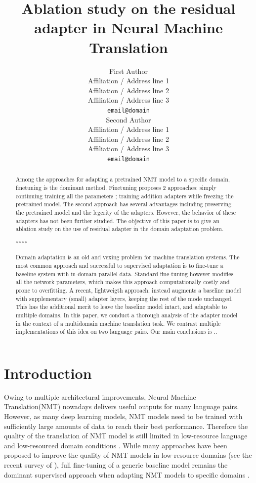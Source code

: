 \documentclass[11pt,a4paper]{article}
\title{Ablation study on the residual adapter in Neural Machine Translation}
\author{First Author \\
  Affiliation / Address line 1 \\
  Affiliation / Address line 2 \\
  Affiliation / Address line 3 \\
  \texttt{email@domain} \\\And
  Second Author \\
  Affiliation / Address line 1 \\
  Affiliation / Address line 2 \\
  Affiliation / Address line 3 \\
  \texttt{email@domain} \\}
\date{}
\newcommand{\fyTodo}[1]{\Todo[FY:]{\textcolor{orange}{#1}}}
\newcommand{\mpTodo}[1]{\Todo[MP:]{\textcolor{green}{#1}}}
\begin{document}
\maketitle
\begin{abstract}
Among the approaches for adapting a pretrained NMT model to a specific domain, finetuning is the dominant method. Finetuning proposes 2 approaches: simply continuing training all the parameters \cite{Luong15stanford}; training addition adapters while freezing the pretrained model\cite{Bapna19simple, Vilar18learning}. The second approach has several advantages including preserving the pretrained model and the legerity of the adapters. However, the behavior of these adapters has not been further studied. The objective of this paper is to give an ablation study on the use of residual adapter in the domain adaptation problem.
\mpTodo{correcting abstract}

**** 

\fyTodo{Citation-free abstract}
Domain adaptation is an old and vexing problem for machine translation systems. The most common approach and successful to supervised adaptation is to fine-tune a baseline system with in-domain parallel data. Standard fine-tuning however modifies all the network parameters, which makes this approach computationally costly and prone to overfitting. A recent, lightweigth approach, instead augments a baseline model with supplementary (small) adapter layers, keeping the rest of the mode unchanged. This has the additional merit to leave the baseline model intact, and adaptable to multiple domains. In this paper, we conduct a thorough analysis of the adapter model in the context of a multidomain machine translation task. We contrast multiple implementations of this idea on two language pairs. Our main conclusions is ..\fyTodo{abstract to be continued}

\end{abstract}
\section{Introduction } \label{sec:intro}
\mpTodo{write introduction} \fyTodo{Citations in chronological order}\fyTodo{Split long sentences}
Owing to multiple architectural improvements, Neural Machine Translation(NMT) \cite{Kalchbrenner13recurrent,Sutskever14sequence Bahdanau15learning,Vaswani17attention} nowadays delivers useful outputs for many language pairs. However, as many deep learning models, NMT models need to be trained with sufficiently large amounts of data to reach their best performance. Therefore the quality of the translation of NMT model is still limited in low-resource language and low-resourced domain conditions \cite{duh13adaptation, zoph16transfer,koehn17six}. While many approaches have been proposed to improve the quality of NMT models in low-resource domains (see the recent survey of \citet{Chu18asurvey}), full fine-tuning of a generic baseline model remains the dominant supervised approach when adapting NMT models to specific domains \cite{Luong15stanford,neubig18rapid}.
\end{document}
